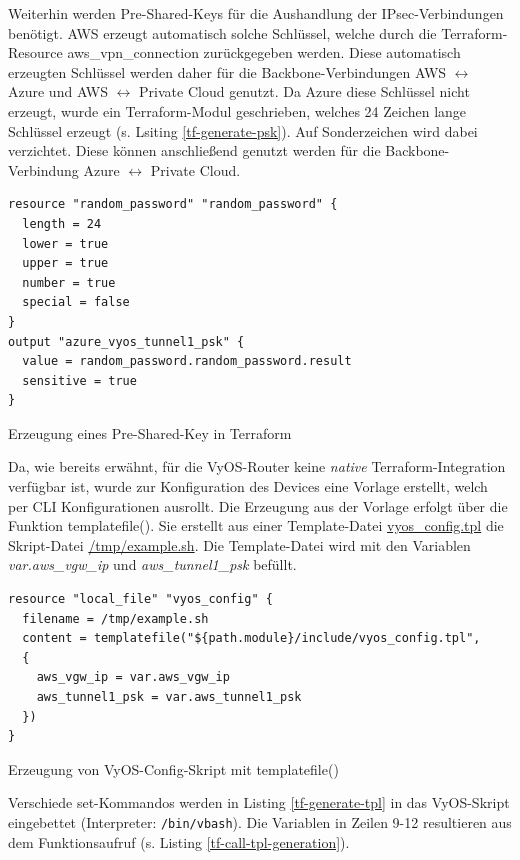 Weiterhin werden Pre-Shared-Keys für die Aushandlung der \gls{IPsec}-Verbindungen benötigt. AWS erzeugt automatisch solche Schlüssel, welche durch die Terraform-Resource \glqq aws\_vpn\_connection\grqq{} zurückgegeben werden. Diese automatisch erzeugten Schlüssel werden daher für die Backbone-Verbindungen AWS $\leftrightarrow$ Azure und AWS $\leftrightarrow$ Private Cloud genutzt. Da Azure diese Schlüssel nicht erzeugt, wurde ein Terraform-Modul geschrieben, welches 24 Zeichen lange Schlüssel erzeugt (s. Lsiting \ref{tf-generate-psk}). Auf Sonderzeichen wird dabei verzichtet. Diese können anschließend genutzt werden für die Backbone-Verbindung Azure $\leftrightarrow$ Private Cloud.
\begin{listing}[h]
\begin{verbatim}
resource "random_password" "random_password" {
  length = 24
  lower = true
  upper = true
  number = true
  special = false
}
output "azure_vyos_tunnel1_psk" {
  value = random_password.random_password.result
  sensitive = true
}
\end{verbatim}
\caption{Erzeugung eines Pre-Shared-Key in Terraform}
\label{tf-generate-psk}
\end{listing}\FloatBarrier
Da, wie bereits erwähnt, für die VyOS-Router keine \textit{native} Terraform-Integration verfügbar ist, wurde zur Konfiguration des Devices eine Vorlage erstellt, welch per CLI Konfigurationen ausrollt.
Die Erzeugung aus der Vorlage erfolgt über die Funktion templatefile()\cite{templatefiletf2021}. Sie erstellt aus einer Template-Datei \underline{vyos\_config.tpl} die Skript-Datei \underline{/tmp/example.sh}. Die Template-Datei wird mit den Variablen \textit{var.aws\_vgw\_ip} und \textit{aws\_tunnel1\_psk} befüllt.
\begin{listing}[h]
\begin{verbatim}
resource "local_file" "vyos_config" {
  filename = /tmp/example.sh
  content = templatefile("${path.module}/include/vyos_config.tpl",
  {
    aws_vgw_ip = var.aws_vgw_ip
    aws_tunnel1_psk = var.aws_tunnel1_psk
  })
}

\end{verbatim}
\caption{Erzeugung von VyOS-Config-Skript mit templatefile()}
\label{tf-call-tpl-generation}
\end{listing}\FloatBarrier
Verschiede set-Kommandos werden in Listing \ref{tf-generate-tpl} in das VyOS-Skript eingebettet (Interpreter: \texttt{/bin/vbash}). Die Variablen in Zeilen 9-12 resultieren aus dem Funktionsaufruf (s. Listing \ref{tf-call-tpl-generation}).
